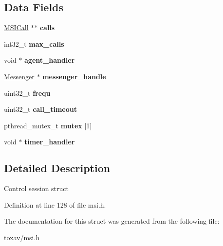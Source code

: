 \subsection*{Data Fields}
\begin{DoxyCompactItemize}
\item 
\hypertarget{struct___m_s_i_session_ac40fee673bae4030b812579c57389a02}{\hyperlink{struct___m_s_i_call}{M\+S\+I\+Call} $\ast$$\ast$ {\bfseries calls}}\label{struct___m_s_i_session_ac40fee673bae4030b812579c57389a02}

\item 
\hypertarget{struct___m_s_i_session_ae4bbb4682dc5c74588083ca06ac2f76f}{int32\+\_\+t {\bfseries max\+\_\+calls}}\label{struct___m_s_i_session_ae4bbb4682dc5c74588083ca06ac2f76f}

\item 
\hypertarget{struct___m_s_i_session_ae284478ea42e8d4ed283876c3ae18c8a}{void $\ast$ {\bfseries agent\+\_\+handler}}\label{struct___m_s_i_session_ae284478ea42e8d4ed283876c3ae18c8a}

\item 
\hypertarget{struct___m_s_i_session_a2adfe301d17504006b8321f71f642039}{\hyperlink{struct_messenger}{Messenger} $\ast$ {\bfseries messenger\+\_\+handle}}\label{struct___m_s_i_session_a2adfe301d17504006b8321f71f642039}

\item 
\hypertarget{struct___m_s_i_session_a54c9341406a254204cca6d48dd54cdc8}{uint32\+\_\+t {\bfseries frequ}}\label{struct___m_s_i_session_a54c9341406a254204cca6d48dd54cdc8}

\item 
\hypertarget{struct___m_s_i_session_a4a61d9413f442d27898849e0d8a26720}{uint32\+\_\+t {\bfseries call\+\_\+timeout}}\label{struct___m_s_i_session_a4a61d9413f442d27898849e0d8a26720}

\item 
\hypertarget{struct___m_s_i_session_ab4293016252c4d4e63549b0773fa0f33}{pthread\+\_\+mutex\+\_\+t {\bfseries mutex} \mbox{[}1\mbox{]}}\label{struct___m_s_i_session_ab4293016252c4d4e63549b0773fa0f33}

\item 
\hypertarget{struct___m_s_i_session_a06ab765308a606d809c4c2a2c71710ce}{void $\ast$ {\bfseries timer\+\_\+handler}}\label{struct___m_s_i_session_a06ab765308a606d809c4c2a2c71710ce}

\end{DoxyCompactItemize}


\subsection{Detailed Description}
Control session struct 

Definition at line 128 of file msi.\+h.



The documentation for this struct was generated from the following file\+:\begin{DoxyCompactItemize}
\item 
toxav/msi.\+h\end{DoxyCompactItemize}
